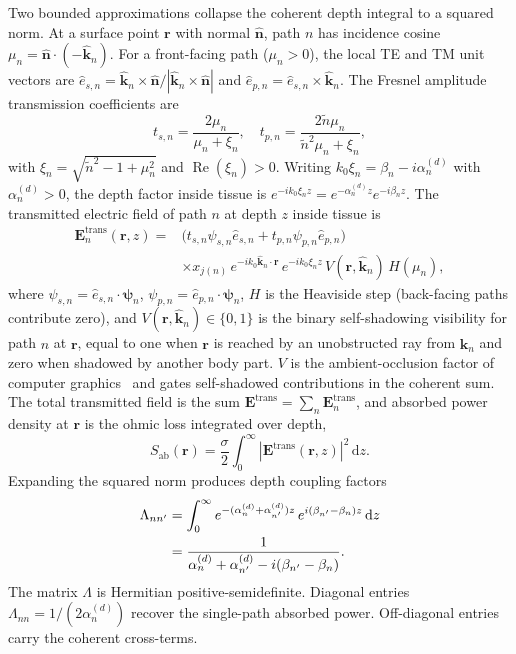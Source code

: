 \documentclass[journal,twocolumn,10pt]{IEEEtran}
\theoremstyle{plain}
\theoremstyle{remark}
\newcommand{\khat}{\hat{\bm{k}}}
\newcommand{\nhat}{\hat{\bm{n}}}
\newcommand{\rr}{\mathbf{r}}
\newcommand{\Sab}{S_{\mathrm{ab}}}
\newcommand{\psin}{\bm{\psi}_n}
\newcommand{\diff}{\mathrm{d}}
\newcommand{\ntilde}{\tilde{n}}
\newcommand{\Vis}{V}
\DeclareMathOperator{\RE}{Re}
\begin{document}
Two bounded approximations collapse the coherent depth integral to a
squared norm. At a surface point $\rr$ with normal $\nhat$, path $n$
has incidence cosine $\mu_n = \nhat \cdot (-\khat_n)$. For a
front-facing path ($\mu_n > 0$), the local TE and TM unit vectors are
$\hat{e}_{s,n} = \khat_n \times \nhat / |\khat_n \times \nhat|$ and
$\hat{e}_{p,n} = \hat{e}_{s,n} \times \khat_n$. The Fresnel
amplitude transmission coefficients are
\begin{equation}\label{eq:t-coef}
  t_{s,n} = \frac{2 \mu_n}{\mu_n + \xi_n},
  \quad
  t_{p,n} = \frac{2 \ntilde \mu_n}{\ntilde^2 \mu_n + \xi_n},
\end{equation}
with $\xi_n = \sqrt{\ntilde^2 - 1 + \mu_n^2}$ and
$\RE(\xi_n) > 0$. Writing $k_0 \xi_n = \beta_n - i\alpha_n^{(d)}$
with $\alpha_n^{(d)} > 0$, the depth factor inside tissue is
$e^{-i k_0 \xi_n z} = e^{-\alpha_n^{(d)} z} e^{-i \beta_n z}$. The
transmitted electric field of path $n$ at depth $z$ inside tissue is
\begin{equation}\label{eq:E-trans}
\begin{aligned}
  \mathbf{E}_n^{\mathrm{trans}}(\rr, z) ={}&
  \bigl(t_{s,n} \psi_{s,n} \hat{e}_{s,n} + t_{p,n} \psi_{p,n} \hat{e}_{p,n}\bigr) \\
  &\times x_{j(n)}\,e^{-i k_0 \khat_n \cdot \rr}\,e^{-i k_0 \xi_n z}\,
  \Vis(\rr,\khat_n)\,H(\mu_n),
\end{aligned}
\end{equation}
where $\psi_{s,n} = \hat{e}_{s,n} \cdot \psin$,
$\psi_{p,n} = \hat{e}_{p,n} \cdot \psin$, $H$ is the Heaviside step
(back-facing paths contribute zero), and $\Vis(\rr,\khat_n) \in
\{0,1\}$ is the binary self-shadowing visibility for path $n$ at
$\rr$, equal to one when $\rr$ is reached by an unobstructed ray
from $\khat_n$ and zero when shadowed by another body part. $\Vis$
is the ambient-occlusion factor of computer
graphics~\cite{Zhukov1998,Landis2002,AkenineMoller2018} and gates
self-shadowed contributions in the coherent sum. The total transmitted
field is the sum
$\mathbf{E}^{\mathrm{trans}} = \sum_n \mathbf{E}_n^{\mathrm{trans}}$,
and absorbed power density at $\rr$ is the ohmic loss integrated
over depth,
\begin{equation}\label{eq:Sab-int}
  \Sab(\rr) = \frac{\sigma}{2} \int_0^\infty
  |\mathbf{E}^{\mathrm{trans}}(\rr, z)|^2\,\diff z.
\end{equation}
Expanding the squared norm produces depth coupling factors
\begin{align}\label{eq:Lambda}
  \Lambda_{nn'}
  &= \int_0^\infty
    e^{-(\alpha_n^{(d)} + \alpha_{n'}^{(d)}) z}\,
    e^{i(\beta_{n'} - \beta_n) z}\,\diff z \notag\\
  &= \frac{1}{\alpha_n^{(d)} + \alpha_{n'}^{(d)} - i(\beta_{n'} - \beta_n)}.
\end{align}
The matrix $\Lambda$ is Hermitian positive-semidefinite. Diagonal
entries $\Lambda_{nn} = 1/(2\alpha_n^{(d)})$ recover the single-path
absorbed power. Off-diagonal entries carry the coherent cross-terms.
\end{document}
